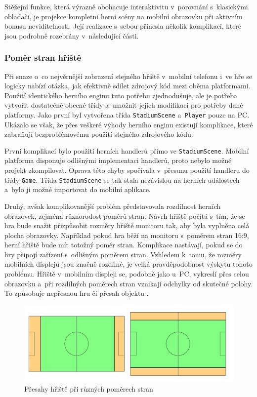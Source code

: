 \documentclass[thesis=B,czech,hidelinks]{FITthesis}[2012/06/26] %
\newcommand{\code}[1]{\texttt{#1}}
\begin{document}
Stěžejní funkce, která výrazně obohacuje interaktivitu v~porovnání s~klasickými obladači, je projekce kompletní herní scény na mobilní obrazovku při aktivním bonusu neviditelnosti. Její realizace s~sebou přinesla několik komplikací, které jsou podrobně rozebrány v~následující části. 

\subsubsection{Poměr stran hřiště}

Při snaze o~co nejvěrnější zobrazení stejného hřiště v~mobilní telefonu i~ve hře se logicky nabízí otázka, jak efektivně sdílet zdrojový kód mezi oběma platformami. Použití identického herního enginu tuto potřebu zjednodušuje, ale je potřeba vytvořit dostatečně obecné třídy a~umožnit jejich modifikaci pro potřeby dané platformy. Jako první byl vytvořena třída \code{StadiumScene} a~\code{Player} pouze na PC. Ukázalo se však, že přes veškeré výhody herního enginu existují komplikace, které zabraňují bezproblémovému použití stejného zdrojového kódu:

První komplikací bylo použití herních handlerů přímo ve \code{StadiumScene}. Mobilní platforma disponuje odlišnými implementaci handlerů, proto nebylo možné projekt zkompilovat. Oprava této chyby spočívala v~přesunu použití handleru do třídy \code{Game}. Třída \code{StadiumScene} se tak stala nezávislou na herních událostech a~bylo ji možné importovat do mobilní aplikace.

Druhý, avšak komplikovanější problém představovala rozdílnost herních obrazovek, zejména různorodost poměrů stran. Návrh hřiště počítá s~tím, že se hra bude snažit přizpůsobit rozměry hřiště monitoru tak, aby byla vyplněna celá plocha obrazovky. Například pokud hra běží na monitoru s~poměrem stran 16:9, herní hřiště bude mít totožný poměr stran. Komplikace nastávají, pokud se do hry připojí zařízení s~odlišným poměrem stran. Vzhledem k~tomu, že rozměry mobilních displejů jsou značně rozdílné, je velká pravděpodobnost výskytu tohoto problému. Hřiště v~mobilním displeji se, podobně jako u~PC, vykreslí přes celou obrazovku a~při rozdílných poměrech stran vznikají odchylky od skutečné polohy. To způsobuje nepřesnou hru či přesah objektu .

\begin{figure}
\center
\includegraphics[width=\textwidth]{stadium_proportions_2}
\caption{Přesahy hřiště při různých poměrech stran}
\label{picture:stadium_proportions}
\end{figure}
\end{document}
